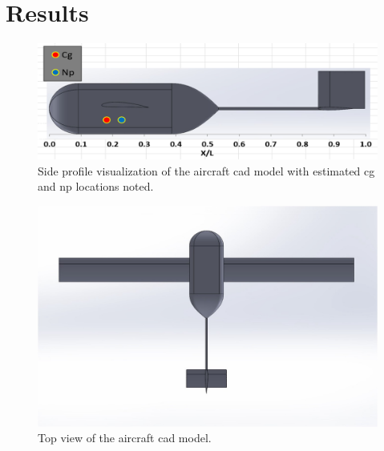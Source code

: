 \chapter{Results}\label{cp:results}

\begin{figure}[htpb]
    \centering
    \includegraphics[width=\linewidth]{Figures/cg_np_side_view.png}
    \caption[\acrshort{cad} model with estimated \acrshort{cg} and \acrshort{np} locations]{Side profile visualization of the aircraft \acrfull{cad} model with estimated \acrfull{cg} and \acrfull{np} locations noted.}
    \label{fig:cg_np_side_view}
\end{figure}

\begin{figure}[htpb]
    \centering
    \includegraphics[width=0.9\linewidth]{Figures/top_view.jpeg}
    \caption[Top view of the \acrshort{cad} model]{Top view of the aircraft \acrshort{cad} model.}
    \label{fig:top_view}
\end{figure}

